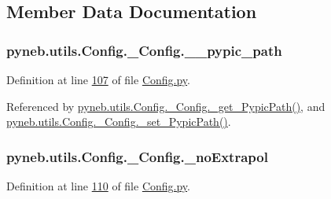 \subsection{Member Data Documentation}
\hypertarget{classpyneb_1_1utils_1_1_config_1_1___config_a1c122165aa8885ce11f9bf86d08c40cd}{
\subsubsection[{\-\_\-\-\_\-pypic\-\_\-path}]{\setlength{\rightskip}{0pt plus 5cm}pyneb.\-utils.\-Config.\-\_\-\-Config.\-\_\-\-\_\-pypic\-\_\-path\hspace{0.3cm}{\ttfamily [private]}}}\label{classpyneb_1_1utils_1_1_config_1_1___config_a1c122165aa8885ce11f9bf86d08c40cd}


Definition at line \hyperlink{_config_8py_source_l00107}{107} of file \hyperlink{_config_8py_source}{Config.\-py}.



Referenced by \hyperlink{_config_8py_source_l00115}{pyneb.\-utils.\-Config.\-\_\-\-Config.\-\_\-get\-\_\-\-Pypic\-Path()}, and \hyperlink{_config_8py_source_l00168}{pyneb.\-utils.\-Config.\-\_\-\-Config.\-\_\-set\-\_\-\-Pypic\-Path()}.

\hypertarget{classpyneb_1_1utils_1_1_config_1_1___config_a0fd9f60b73f8af4fda56fed8c6683a1c}{
\subsubsection[{\-\_\-no\-Extrapol}]{\setlength{\rightskip}{0pt plus 5cm}pyneb.\-utils.\-Config.\-\_\-\-Config.\-\_\-no\-Extrapol\hspace{0.3cm}{\ttfamily [private]}}}\label{classpyneb_1_1utils_1_1_config_1_1___config_a0fd9f60b73f8af4fda56fed8c6683a1c}


Definition at line \hyperlink{_config_8py_source_l00110}{110} of file \hyperlink{_config_8py_source}{Config.\-py}.



